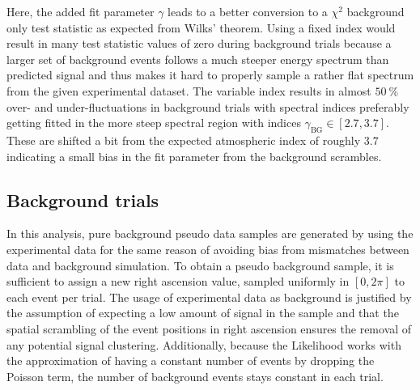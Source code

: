 Here, the added fit parameter $\gamma$ leads to a better conversion to a $\chi^2$ background only test statistic as expected from Wilks' theorem.
Using a fixed index would result in many test statistic values of zero during background trials because a larger set of background events follows a much steeper energy spectrum than predicted signal and thus makes it hard to properly sample a rather flat spectrum from the given experimental dataset.
The variable index results in almost $\SI{50}{\percent}$ over- and under-fluctuations in background trials with spectral indices preferably getting fitted in the more steep spectral region with indices $\gamma_\text{BG}\in[2.7, 3.7]$.
These are shifted a bit from the expected atmospheric index of roughly $\num{3.7}$ indicating a small bias in the fit parameter from the background scrambles.

\subsection*{Background trials}
In this analysis, pure background pseudo data samples are generated by using the experimental data for the same reason of avoiding bias from mismatches between data and background simulation.
To obtain a pseudo background sample, it is sufficient to assign a new right ascension value, sampled uniformly in $[0, 2\pi]$ to each event per trial.
The usage of experimental data as background is justified by the assumption of expecting a low amount of signal in the sample and that the spatial scrambling of the event positions in right ascension ensures the removal of any potential signal clustering.
Additionally, because the Likelihood works with the approximation of having a constant number of events by dropping the Poisson term, the number of background events stays constant in each trial.

